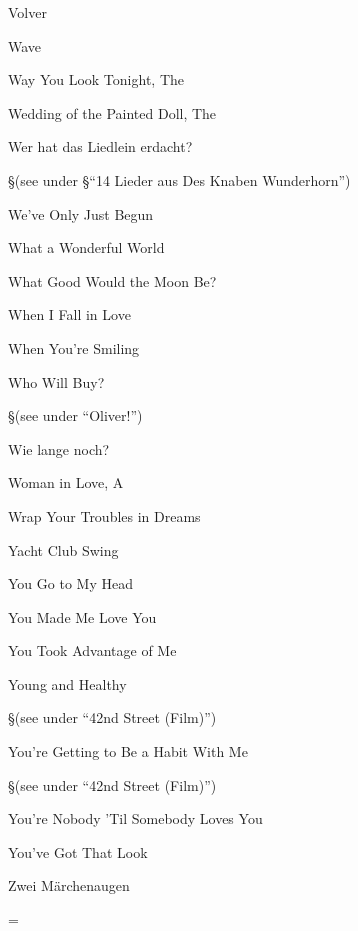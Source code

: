 \N Volver


\N Wave


\N Way You Look Tonight, The


\N Wedding of the Painted Doll, The


\N Wer hat das Liedlein erdacht?

\nobreak
\S (see under
\S ``14 Lieder aus Des Knaben Wunderhorn'')

\N We've Only Just Begun


\N What a Wonderful World


\N What Good Would the Moon Be?


\N When I Fall in Love


\N When You're Smiling


\N Who Will Buy?

\nobreak
\S (see under ``Oliver!'')

\N Wie lange noch?


\N Woman in Love, A


\N Wrap Your Troubles in Dreams


\N Yacht Club Swing


\N You Go to My Head


\N You Made Me Love You


\N You Took Advantage of Me


\N Young and Healthy

\nobreak
\S (see under ``42nd Street (Film)'')

\N You're Getting to Be a Habit With Me

\nobreak
\S (see under ``42nd Street (Film)'')

\N You're Nobody 'Til Somebody Loves You


\N You've Got That Look


\N Zwei M{\"a}rchenaugen


\singlecolumn
\vfil\eject
\pagecnt=\pageno
\endinput

